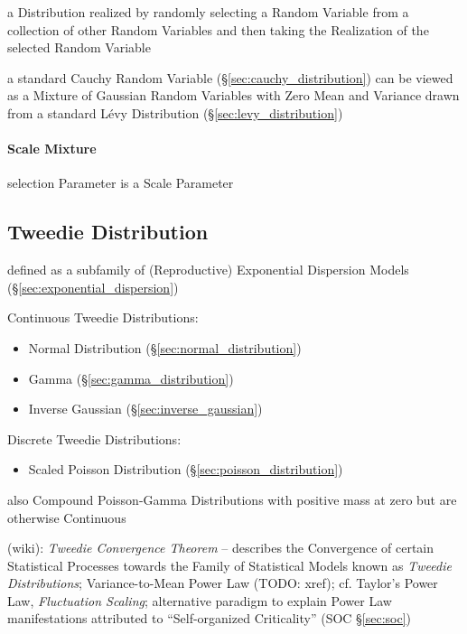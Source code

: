 a Distribution realized by randomly selecting a Random Variable from a
collection of other Random Variables and then taking the Realization of the
selected Random Variable

a standard Cauchy Random Variable (\S\ref{sec:cauchy_distribution}) can be
viewed as a Mixture of Gaussian Random Variables with Zero Mean and Variance
drawn from a standard L\'evy Distribution (\S\ref{sec:levy_distribution})



\paragraph{Scale Mixture}\label{sec:scale_mixture}\hfill

selection Parameter is a Scale Parameter



\subsection{Tweedie Distribution}\label{sec:tweedie_distribution}

defined as a subfamily of (Reproductive) Exponential Dispersion Models
(\S\ref{sec:exponential_dispersion})

Continuous Tweedie Distributions:
\begin{itemize}
  \item Normal Distribution (\S\ref{sec:normal_distribution})
  \item Gamma (\S\ref{sec:gamma_distribution})
  \item Inverse Gaussian (\S\ref{sec:inverse_gaussian})
\end{itemize}

Discrete Tweedie Distributions:
\begin{itemize}
  \item Scaled Poisson Distribution (\S\ref{sec:poisson_distribution})
\end{itemize}

also Compound Poisson-Gamma Distributions with positive mass at zero but are
otherwise Continuous

(wiki): \emph{Tweedie Convergence Theorem} -- describes the Convergence of
certain Statistical Processes towards the Family of Statistical Models known as
\emph{Tweedie Distributions}; Variance-to-Mean Power Law (TODO: xref); cf.
Taylor's Power Law, \emph{Fluctuation Scaling}; alternative paradigm to explain
Power Law manifestations attributed to ``Self-organized Criticality'' (SOC
\S\ref{sec:soc})

